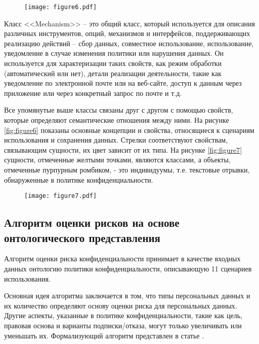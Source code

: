 \documentclass[../main]{subfiles}
\begin{document}
\begin{figure}[H]
    \centering
    {\texttt{[image: figure6.pdf]}}
    \vspace{-\baselineskip}
\end{figure}

Класс <<Mechanism>> -- это общий класс, который используется для описания различных инструментов, опций, механизмов и интерфейсов, поддерживающих реализацию действий -- сбор данных, совместное использование, использование, уведомление в случае изменения политики или нарушения данных. Он используется для характеризации таких свойств, как режим обработки (автоматический или нет), детали реализации деятельности, такие как уведомление по электронной почте или на веб-сайте, доступ к данным через приложение или через конкретный запрос по почте и т.д.

Все упомянутые выше классы связаны друг с другом с помощью свойств, которые определяют семантические отношения между ними. На рисунке \ref{fig:figure6} показаны основные концепции и свойства, относящиеся к сценариям использования и сохранения данных. Стрелки соответствуют свойствам, связывающим сущности, их цвет зависит от их типа. На рисунке \ref{fig:figure7} сущности, отмеченные желтыми точками, являются классами, а объекты, отмеченные пурпурным ромбиком, - это индивидуумы, т.е. текстовые отрывки, обнаруженные в политике конфиденциальности.

\begin{figure}[H]
    \centering
    {\texttt{[image: figure7.pdf]}}
    \vspace{-\baselineskip}
\end{figure}

\subsection{Алгоритм оценки рисков на основе онтологического представления}
Алгоритм оценки риска конфиденциальности принимает в качестве входных данных онтологию политики конфиденциальности, описывающую 11 сценариев использования.

Основная идея алгоритма заключается в том, что типы персональных данных и их количество определяют основу оценки риска для персональных данных. Другие аспекты, указанные в политике конфиденциальности, такие как цель, правовая основа и варианты подписки/отказа, могут только увеличивать или уменьшать их. Формализующий алгоритм представлен в статье \cite{P2Onto}.
\end{document}
